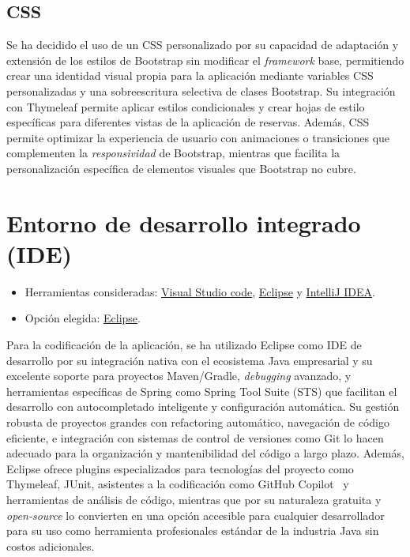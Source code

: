 \subsection{CSS}\label{css}
Se ha decidido el uso de un CSS personalizado por su capacidad de adaptación y extensión de los estilos de Bootstrap sin modificar el \emph{framework} base, permitiendo crear una identidad visual propia para la aplicación mediante variables CSS personalizadas y una sobreescritura selectiva de clases Bootstrap. Su integración con Thymeleaf permite aplicar estilos condicionales y crear hojas de estilo específicas para diferentes vistas de la aplicación de reservas. Además, CSS permite optimizar la experiencia de usuario con animaciones o transiciones que complementen la \emph{responsividad} de Bootstrap, mientras que facilita la personalización específica de elementos visuales que Bootstrap no cubre.

\section{Entorno de desarrollo integrado (IDE)}\label{entorno-de-desarrollo-integrado}

\begin{itemize}
\tightlist
\item
  Herramientas consideradas: 
  \href{https://code.visualstudio.com/}{Visual Studio code}, 
  \href{https://eclipse.org/}{Eclipse} y
  \href{https://www.jetbrains.com/idea/}{IntelliJ IDEA}.
\item
  Opción elegida: \href{https://eclipse.org/}{Eclipse}.
\end{itemize}

Para la codificación de la aplicación, se ha utilizado Eclipse como IDE de desarrollo por su integración nativa con el ecosistema Java empresarial y su excelente soporte para proyectos Maven/Gradle, \emph{debugging} avanzado, y herramientas específicas de Spring como Spring Tool Suite (STS) que facilitan el desarrollo con autocompletado inteligente y configuración automática. Su gestión robusta de proyectos grandes con refactoring automático, navegación de código eficiente, e integración con sistemas de control de versiones como Git lo hacen adecuado para la organización y mantenibilidad del código a largo plazo. Además, Eclipse ofrece plugins especializados para tecnologías del proyecto como Thymeleaf, JUnit, asistentes a la codificación como GitHub Copilot~\cite{github-copilot} y herramientas de análisis de código, mientras que por su naturaleza gratuita y \emph{open-source} lo convierten en una opción accesible para cualquier desarrollador para su uso como herramienta profesionales estándar de la industria Java sin costos adicionales.
